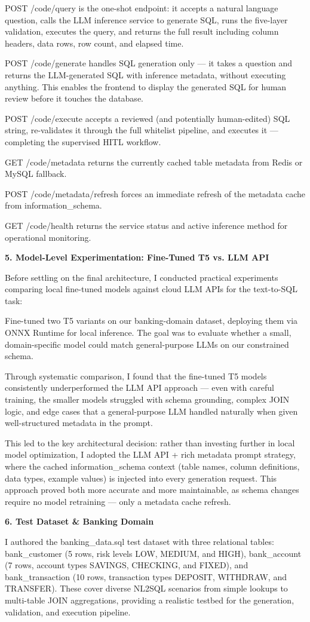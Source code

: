 POST /code/query is the one-shot endpoint: it accepts a natural language question, calls the LLM inference service to generate SQL, runs the five-layer validation, executes the query, and returns the full result including column headers, data rows, row count, and elapsed time.

POST /code/generate handles SQL generation only — it takes a question and returns the LLM-generated SQL with inference metadata, without executing anything. This enables the frontend to display the generated SQL for human review before it touches the database.

POST /code/execute accepts a reviewed (and potentially human-edited) SQL string, re-validates it through the full whitelist pipeline, and executes it — completing the supervised HITL workflow.

GET /code/metadata returns the currently cached table metadata from Redis or MySQL fallback.

POST /code/metadata/refresh forces an immediate refresh of the metadata cache from information\_schema.

GET /code/health returns the service status and active inference method for operational monitoring.

\textbf{5. Model-Level Experimentation: Fine-Tuned T5 vs. LLM API}

Before settling on the final architecture, I conducted practical experiments comparing local fine-tuned models against cloud LLM APIs for the text-to-SQL task:

Fine-tuned two T5 variants on our banking-domain dataset, deploying them via ONNX Runtime for local inference. The goal was to evaluate whether a small, domain-specific model could match general-purpose LLMs on our constrained schema.

Through systematic comparison, I found that the fine-tuned T5 models consistently underperformed the LLM API approach — even with careful training, the smaller models struggled with schema grounding, complex JOIN logic, and edge cases that a general-purpose LLM handled naturally when given well-structured metadata in the prompt.

This led to the key architectural decision: rather than investing further in local model optimization, I adopted the LLM API + rich metadata prompt strategy, where the cached information\_schema context (table names, column definitions, data types, example values) is injected into every generation request. This approach proved both more accurate and more maintainable, as schema changes require no model retraining — only a metadata cache refresh.

\textbf{6. Test Dataset \& Banking Domain}

I authored the banking\_data.sql test dataset with three relational tables: bank\_customer (5 rows, risk levels LOW, MEDIUM, and HIGH), bank\_account (7 rows, account types SAVINGS, CHECKING, and FIXED), and bank\_transaction (10 rows, transaction types DEPOSIT, WITHDRAW, and TRANSFER). These cover diverse NL2SQL scenarios from simple lookups to multi-table JOIN aggregations, providing a realistic testbed for the generation, validation, and execution pipeline.


